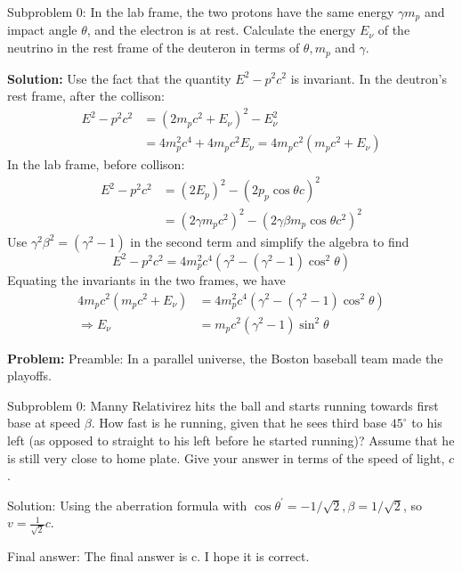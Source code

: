 \documentclass[10pt]{article}
\begin{document}
Subproblem 0: In the lab frame, the two protons have the same energy $\gamma m_{p}$ and impact angle $\theta$, and the electron is at rest. Calculate the energy $E_{\nu}$ of the neutrino in the rest frame of the deuteron in terms of $\theta, m_{p}$ and $\gamma$.


\textbf{Solution:}
Use the fact that the quantity $E^{2}-p^{2} c^{2}$ is invariant. In the deutron's rest frame, after the collison:
\[
\begin{aligned}
E^{2}-p^{2} c^{2} &=\left(2 m_{p} c^{2}+E_{\nu}\right)^{2}-E_{\nu}^{2} \\
&=4 m_{p}^{2} c^{4}+4 m_{p} c^{2} E_{\nu}=4 m_{p} c^{2}\left(m_{p} c^{2}+E_{\nu}\right)
\end{aligned}
\]
In the lab frame, before collison:
\[
\begin{aligned}
E^{2}-p^{2} c^{2} &=\left(2 E_{p}\right)^{2}-\left(2 p_{p} \cos \theta c\right)^{2} \\
&=\left(2 \gamma m_{p} c^{2}\right)^{2}-\left(2 \gamma \beta m_{p} \cos \theta c^{2}\right)^{2}
\end{aligned}
\]
Use $\gamma^{2} \beta^{2}=\left(\gamma^{2}-1\right)$ in the second term and simplify the algebra to find
\[
E^{2}-p^{2} c^{2}=4 m_{p}^{2} c^{4}\left(\gamma^{2}-\left(\gamma^{2}-1\right) \cos ^{2} \theta\right)
\]
Equating the invariants in the two frames, we have
\[
\begin{aligned}
4 m_{p} c^{2}\left(m_{p} c^{2}+E_{\nu}\right) &=4 m_{p}^{2} c^{4}\left(\gamma^{2}-\left(\gamma^{2}-1\right) \cos ^{2} \theta\right) \\
\Rightarrow E_{\nu} &= \boxed{m_{p} c^{2}\left(\gamma^{2}-1\right) \sin ^{2} \theta}
\end{aligned}
\]


\textbf{Problem:}
Preamble: In a parallel universe, the Boston baseball team made the playoffs.

Subproblem 0: Manny Relativirez hits the ball and starts running towards first base at speed $\beta$. How fast is he running, given that he sees third base $45^{\circ}$ to his left (as opposed to straight to his left before he started running)? Assume that he is still very close to home plate. Give your answer in terms of the speed of light, $c$.


Solution: Using the aberration formula with $\cos \theta^{\prime}=-1 / \sqrt{2}, \beta=1 / \sqrt{2}$, so $v=\boxed{\frac{1}{\sqrt{2}}c}$.

Final answer: The final answer is c. I hope it is correct.
\end{document}

